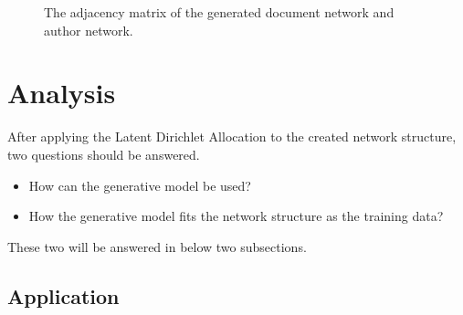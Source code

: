 \documentclass[letterpaper]{article}
\begin{document}
\begin{figure}
\caption{The adjacency matrix of the generated document network and author network.}
\label{fig:gene_ad_mat}
\end{figure}

\section{Analysis}

After applying the Latent Dirichlet Allocation to the created network structure, two questions should be answered.
\begin{itemize}
\item How can the generative model be used?
\item How the generative model fits the network structure as the training data?
\end{itemize}
These two will be answered in below two subsections.

\subsection{Application}
\end{document}
